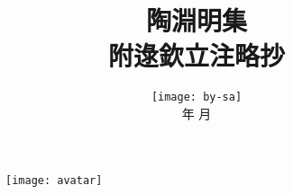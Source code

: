 \documentclass[10pt, a5paper]{ctexbook}
\title{\ziju{0.15}
    \textbf{陶淵明集}\\
    {\small 附逯欽立注略抄}
}
\author{}
\date{
    \vspace{\fill}
    \texttt{[image: by-sa]}\\
    \footnotesize \the\year 年 \the\month 月
}
\begin{document}
\maketitle
\thispagestyle{empty}

\begin{figure}[t]
    \texttt{[image: avatar]}
    \centering
\end{figure}

\frontmatter
\tableofcontents

\mainmatter

\let\cleardoublepage\relax

\let\cleardoublepage\relax

\let\cleardoublepage\relax

\let\cleardoublepage\relax

\let\cleardoublepage\relax

\let\cleardoublepage\relax

\end{document}
